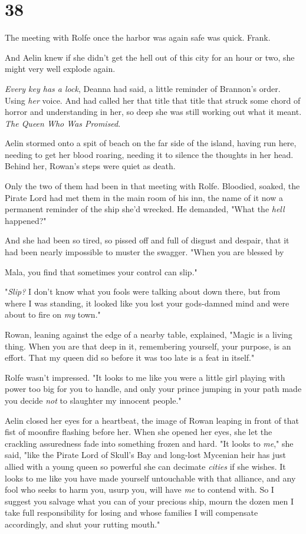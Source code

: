 
\chapter{38}

The meeting with Rolfe once the harbor was again safe was quick. Frank.

And Aelin knew if she didn't get the hell out of this city for an hour or two, she might very well explode again.

\emph{Every key has a lock}, Deanna had said, a little reminder of Brannon's order. Using \emph{her} voice. And had called her that title
 that title that struck some chord of horror and understanding in her, so deep she was still working out what it meant. \emph{The Queen Who Was Promised}.

Aelin stormed onto a spit of beach on the far side of the island, having run here, needing to get her blood roaring, needing it to silence the thoughts in her head. Behind her, Rowan's steps were quiet as death.

Only the two of them had been in that meeting with Rolfe. Bloodied, soaked, the Pirate Lord had met them in the main room of his inn, the name of it now a permanent reminder of the ship she'd wrecked. He demanded, "What the \emph{hell} happened?"

And she had been so tired, so pissed off and full of disgust and despair, that it had been nearly impossible to muster the swagger. "When you are blessed by

Mala, you find that sometimes your control can slip."

"\emph{Slip?} I don't know what you fools were talking about down there, but from where I was standing, it looked like you lost your gods-damned mind and were about to fire on \emph{my} town."

Rowan, leaning against the edge of a nearby table, explained, "Magic is a living thing. When you are that deep in it, remembering yourself, your purpose, is an effort. That my queen did so before it was too late is a feat in itself."

Rolfe wasn't impressed. "It looks to me like you were a little girl playing with power too big for you to handle, and only your prince jumping in your path made you decide \emph{not} to slaughter my innocent people."

Aelin closed her eyes for a heartbeat, the image of Rowan leaping in front of that fist of moonfire flashing before her. When she opened her eyes, she let the crackling assuredness fade into something frozen and hard. "It looks to \emph{me}," she said, "like the Pirate Lord of Skull's Bay and long-lost Mycenian heir has just allied with a young queen so powerful she can decimate \emph{cities} if she wishes. It looks to me like you have made yourself untouchable with that alliance, and any fool who seeks to harm you, usurp you, will have \emph{me} to contend with. So I suggest you salvage what you can of your precious ship, mourn the dozen men I take full responsibility for losing and whose families I will compensate accordingly, and shut your rutting mouth."

